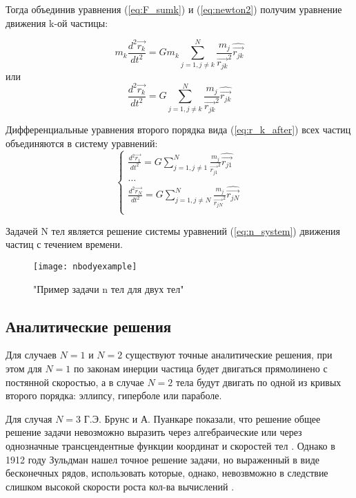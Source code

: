 Тогда объединив уравнения (\ref{eq:F_sumk}) и (\ref{eq:newton2}) получим уравнение движения k-ой частицы:
 
 \begin{equation}
 	\label{eq:r_k_before}
 	m_k\frac{d^2\vec{r_k}}{dt^2} = Gm_k\sum_{j=1, j \neq k}^{N}{\frac{m_j}{\vec{r_{jk}}^2}\hat{\vec{r_{jk}}}}
 \end{equation}
 или
 \begin{equation}
 	\label{eq:r_k_after}
 	\frac{d^2\vec{r_k}}{dt^2} = G\sum_{j=1, j \neq k}^{N}{\frac{m_j}{\vec{r_{jk}}^2}\hat{\vec{r_{jk}}}}
 \end{equation}
 
 Дифференциальные уравнения второго порядка вида (\ref{eq:r_k_after}) всех частиц объединяются в систему уравнений:
  \begin{equation}
 	\label{eq:n_system}
 	\begin{cases}
 		\frac{d^2\vec{r_1}}{dt^2} = G\sum_{j=1, j \neq 1}^{N}{\frac{m_j}{\vec{r_{j1}}^2}\hat{\vec{r_{j1}}}} \\
 		\dots \\
 		\frac{d^2\vec{r_N}}{dt^2} = G\sum_{j=1, j \neq N}^{N}{\frac{m_j}{\vec{r_{jN}}^2}\hat{\vec{r_{jN}}}} \\
 	\end{cases}
 \end{equation}

Задачей N тел является решение системы уравнений (\ref{eq:n_system}) движения частиц с течением времени.

\begin{figure}[h]
	\centering
	\texttt{[image: nbodyexample]}
	\caption{"Пример задачи n тел для двух тел"}
	\label{fig:nbodyexample}
\end{figure}

\subsection{Аналитические решения}
Для случаев $N = 1$ и $N = 2$ существуют точные аналитические решения, при этом для $N = 1$ по законам инерции частица будет двигаться прямолинено с постянной скоростью, а в случае $N = 2$ тела будут двигать по одной из кривых второго порядка: эллипсу, гиперболе или параболе.

Для случая $N = 3$ Г.Э. Брунс и А. Пуанкаре показали, что решение общее решение задачи невозможно выразить через алгебраические или через однозначные трансцендентные функции координат и скоростей тел \cite{markeev}. Однако в 1912 году Зульдман нашел точное решение задачи, но выраженный в виде бесконечных рядов, использовать которые, однако, невозвможно в следствие слишком высокой скорости роста кол-ва вычислений \cite{markeev}.

